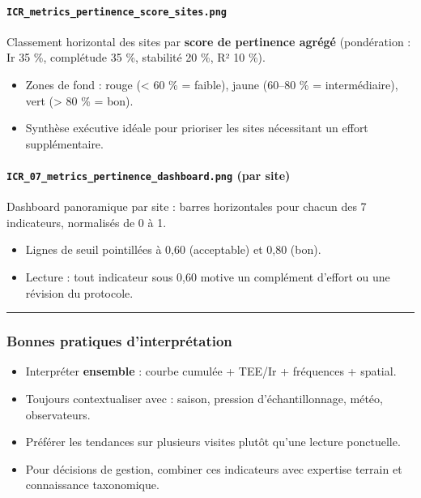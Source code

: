 \paragraph{\texorpdfstring{\texttt{ICR\_metrics\_pertinence\_score\_sites.png}}{ICR\_metrics\_pertinence\_score\_sites.png}}\label{icr_metrics_pertinence_score_sites.png}

Classement horizontal des sites par \textbf{score de pertinence agrégé}
(pondération : Ir 35 \%, complétude 35 \%, stabilité 20 \%, R² 10 \%).

\begin{itemize}
\tightlist
\item
  Zones de fond : rouge (\textless{} 60 \% = faible), jaune (60--80 \% =
  intermédiaire), vert (\textgreater{} 80 \% = bon).
\item
  Synthèse exécutive idéale pour prioriser les sites nécessitant un
  effort supplémentaire.
\end{itemize}

\paragraph{\texorpdfstring{\texttt{ICR\_07\_metrics\_pertinence\_dashboard.png}
(par
site)}{ICR\_07\_metrics\_pertinence\_dashboard.png (par site)}}\label{icr_07_metrics_pertinence_dashboard.png-par-site}

Dashboard panoramique par site : barres horizontales pour chacun des 7
indicateurs, normalisés de 0 à 1.

\begin{itemize}
\tightlist
\item
  Lignes de seuil pointillées à 0,60 (acceptable) et 0,80 (bon).
\item
  Lecture : tout indicateur sous 0,60 motive un complément d'effort ou
  une révision du protocole.
\end{itemize}

\begin{center}\rule{0.5\linewidth}{0.5pt}\end{center}

\subsubsection{Bonnes pratiques
d'interprétation}\label{bonnes-pratiques-dinterpruxe9tation}

\begin{itemize}
\tightlist
\item
  Interpréter \textbf{ensemble} : courbe cumulée + TEE/Ir + fréquences +
  spatial.
\item
  Toujours contextualiser avec : saison, pression d'échantillonnage,
  météo, observateurs.
\item
  Préférer les tendances sur plusieurs visites plutôt qu'une lecture
  ponctuelle.
\item
  Pour décisions de gestion, combiner ces indicateurs avec expertise
  terrain et connaissance taxonomique.
\end{itemize}

